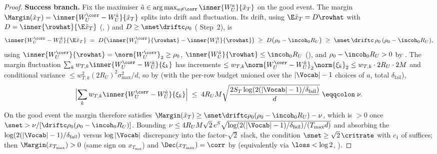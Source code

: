 \begin{proof}
\smallskip\noindent\textbf{Success branch.} Fix the maximiser
$\hat a\in\arg\max_{a\neq\corr}\inner{W_U^a}{\tilde x_T}$ on the good event.
The margin $\Margin(\tilde x_T)=\inner{W_U^{\corr}-W_U^{\hat a}}{\tilde x_T}$
splits into drift and fluctuation. Its drift, using
$\E\tilde x_T=D\rowhat$ with $D=\inner{\rowhat}{\E\tilde x_T}$
(, ) and $D\ge\snet\driftc\rho_0$
( Step~2), is
\begin{align*}
   \inner{W_U^{\corr}-W_U^{\hat a}}{\E\tilde x_T}
   \;=\; D\bigl(\inner{W_U^{\corr}}{\rowhat}-\inner{W_U^{\hat a}}{\rowhat}\bigr)
   \;\ge\; D\bigl(\rho_0-\incoh_0 R_U\bigr)
   \;\ge\; \snet\,\driftc\,\rho_0\,(\rho_0-\incoh_0 R_U),
\end{align*}
using $\inner{W_U^{\corr}}{\rowhat}=\norm{W_U^{\corr}}_2\ge\rho_0$,
$\inner{W_U^{\hat a}}{\rowhat}\le\incoh_0 R_U$ (), and
$\rho_0-\incoh_0 R_U>0$ by . The margin
fluctuation $\sum_k w_{T,k}\inner{W_U^{\corr}-W_U^{\hat a}}{\xi_k}$ has
increments $\le w_{T,k}\norm{W_U^{\corr}-W_U^{\hat a}}_2\norm{\xi_k}_2\le w_{T,k}\cdot2R_U\cdot2M$
and conditional variance $\le w_{T,k}^2(2R_U)^2\sigma_{\max}^2/d$, so by
 (with the per-row budget unioned over the $|\Vocab|-1$
choices of $\hat a$, total $\delta_{\mathrm{fail}}$),
\begin{align*}
   \Bigl|\sum_k w_{T,k}\inner{W_U^{\corr}-W_U^{\hat a}}{\xi_k}\Bigr|
   \;\le\; 4R_U M\sqrt{\frac{2 S_T\log(2(|\Vocab|-1)/\delta_{\mathrm{fail}})}{d}}
   \;\eqqcolon\; \nu .
\end{align*}
On the good event the margin therefore satisfies
$\Margin(\tilde x_T)\ge\snet\driftc\rho_0(\rho_0-\incoh_0 R_U)-\nu$, which is
$>0$ once
$\snet>\nu/[\driftc\rho_0(\rho_0-\incoh_0 R_U)]$. Bounding
$\nu\le4R_U M\sqrt2\,e^S\sqrt{\log(2(|\Vocab|-1)/\delta_{\mathrm{fail}})/(T_{\max}d)}$
and absorbing the $\log(2(|\Vocab|-1)/\delta_{\mathrm{fail}})$ versus
$\log|\Vocab|$ discrepancy into the factor-$\sqrt2$ slack, the condition
$\snet\ge\sqrt2\,\critrate$ with $c_1$ of  suffices;
then $\Margin(x_{T_{\max}})>0$ (same sign on $x_{T_{\max}}$) and
$\Dec(x_{T_{\max}})=\corr$ by  (equivalently via
$\loss<\log2$, ).


\end{proof}
